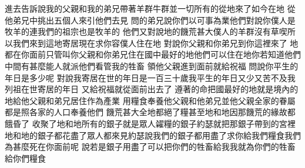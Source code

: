 \bchapter%
進去告訴說\chientien 我的父親和我的弟兄帶著羊群\chientien 牛群\chientien 並一切所有的\chientien 從地來了\chientien 如今在地\chuan 
{}從他弟兄中挑出五個人來\chientien 引他們去見\chuan 
{}問的弟兄說\chientien 你們以可事為業\yuentien 他們對說\chientien 你僕人是牧羊的\chientien 連我們的祖宗\chientien 也是牧羊的\chuan 
{}他們又對說\chientien{}地的饑荒甚大\chientien 僕人的羊群沒有草喫\chientien 所以我們來到這地寄居\yuentien 現在求你容僕人住在地\chuan 
{}對說\chientien 你父親和你弟兄到你這裡來了\yuentien 
{}地都在你面前\chientien 只管叫你父親和你弟兄住在國中最好的地\chientien 他們可以住在地\yuentien 你若知道他們中間有甚麼能人\chientien 就派他們看管我的牲畜\chuan 
{}領他父親進到面前\chientien{}就給祝福\chuan 
{}問說\chientien 你平生的年日是多少呢\chuan 
{}對說\chientien 我寄居在世的年日是一百三十歲\chientien 我平生的年日又少\chientien 又苦\chientien 不及我列祖在世寄居的年日\chuan 
{}又給祝福\chientien 就從面前出去了\chuan 
{}遵著的命\chientien 把國最好的地\chientien 就是境內的地\chientien 給他父親和弟兄居住\chientien 作為產業\chuan 
{}用糧食奉養他父親\chientien 和他弟兄\chientien 並他父親全家的眷屬\chientien 都是照各家的人口奉養他們\chuan\Chuan
{}饑荒甚大\chientien 全地都絕了糧\chientien 甚至地和地\chientien 因那饑荒的緣故\chientien 都餓昏了\chuan 
{}收聚了地和地所有的銀子\chientien 就是眾人糴糧的銀子\chientien 約瑟就把那銀子帶到的宮裡\chuan 
{}地和地的銀子都花盡了\chientien{}眾人都來見約瑟說\chientien 我們的銀子都用盡了\chientien 求你給我們糧食\chientien 我們為甚麼死在你面前呢\chuan 
{}說\chientien 若是銀子用盡了\chientien 可以把你們的牲畜給我\chientien 我就為你們的牲畜給你們糧食\chuan 
